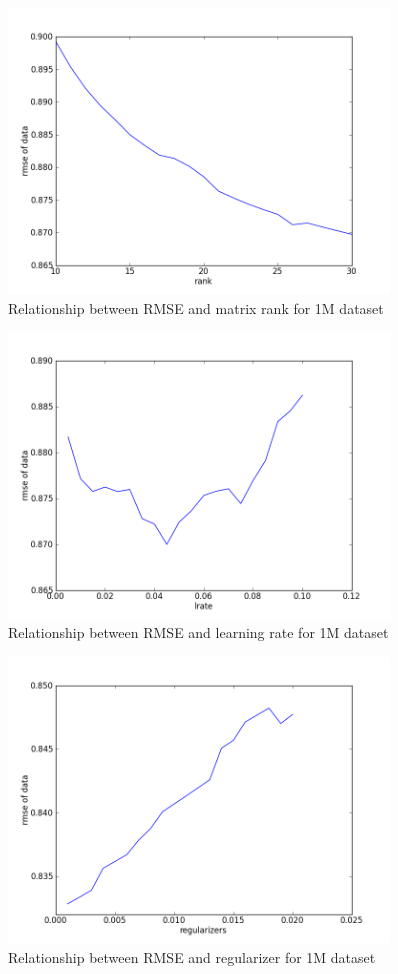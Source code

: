 \documentclass[12pt]{article}
\begin{document}
\begin{figure}[H]
\centering
\includegraphics[width=0.90\textwidth]{bigrmserank.png}
\caption{Relationship between RMSE and matrix rank for 1M dataset}
\end{figure}

\begin{figure}[H]
\centering
\includegraphics[width=0.90\textwidth]{bigrmselr.png}
\caption{Relationship between RMSE and learning rate for 1M dataset}
\end{figure}

\begin{figure}[H]
\centering
\includegraphics[width=0.90\textwidth]{bigrmsereg.png}
\caption{Relationship between RMSE and regularizer for 1M dataset}
\end{figure}
\end{document}
